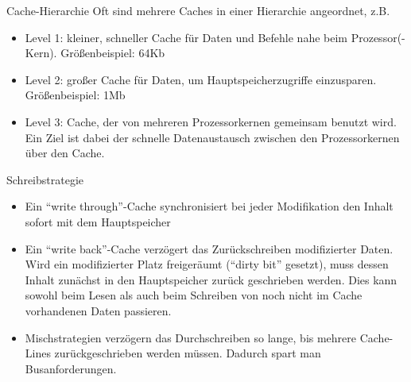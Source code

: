\documentclass[utf8,9pt]{beamer}
\begin{document}
\begin{frame}{}{}
\begin{block}{Cache-Hierarchie}
Oft sind mehrere Caches in einer Hierarchie angeordnet, z.B.
\begin{itemize}
\item Level 1: kleiner, schneller Cache für Daten und Befehle nahe beim
   Prozessor(-Kern). Größenbeispiel:  64Kb
\item   Level 2: großer Cache für Daten, um Hauptspeicherzugriffe einzusparen.
  Größenbeispiel:  1Mb
\item Level 3: Cache, der von mehreren Prozessorkernen gemeinsam
   benutzt wird. Ein Ziel ist dabei der schnelle Datenaustausch zwischen
   den Prozessorkernen über den Cache.  
\end{itemize}
\end{block}


\begin{block}{Schreibstrategie}
\begin{itemize}
\item Ein "`write through"'-Cache synchronisiert bei jeder Modifikation
   den Inhalt sofort mit dem Hauptspeicher
\item  Ein "`write back"'-Cache verzögert das Zurückschreiben modifizierter
Daten.
Wird ein modifizierter Platz freigeräumt ("`dirty bit"' gesetzt), muss dessen Inhalt
zunächst in den Hauptspeicher zurück geschrieben werden. Dies kann sowohl
beim Lesen als auch beim Schreiben von noch nicht im Cache vorhandenen
Daten passieren.  
\item Mischstrategien verzögern das Durchschreiben so lange, bis mehrere
Cache-Lines zurückgeschrieben werden müssen. Dadurch spart man Busanforderungen.
\end{itemize}

\end{block}

\end{frame}
\end{document}

